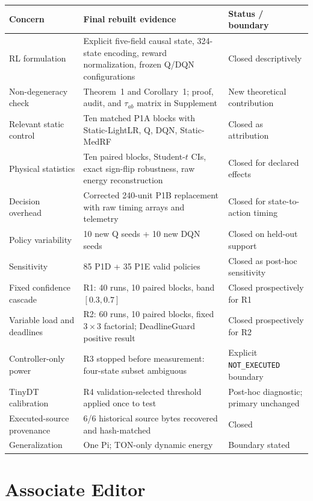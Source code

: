 \documentclass[11pt]{article}
\begin{document}
\begin{center}
\small
\begin{tabular}{p{3.6cm}p{6.8cm}p{4.2cm}}\toprule
\textbf{Concern} & \textbf{Final rebuilt evidence} & \textbf{Status / boundary}\\\midrule
RL formulation & Explicit five-field causal state, 324-state encoding, reward normalization, frozen Q/DQN configurations & Closed descriptively\\
Non-degeneracy check & Theorem~1 and Corollary~1; proof, audit, and $\tau_{ab}$ matrix in Supplement & New theoretical contribution\\
Relevant static control & Ten matched P1A blocks with Static-LightLR, Q, DQN, Static-MedRF & Closed as attribution\\
Physical statistics & Ten paired blocks, Student-$t$ CIs, exact sign-flip robustness, raw energy reconstruction & Closed for declared effects\\
Decision overhead & Corrected 240-unit P1B replacement with raw timing arrays and telemetry & Closed for state-to-action timing\\
Policy variability & 10 new Q seeds + 10 new DQN seeds & Closed on held-out support\\
Sensitivity & 85 P1D + 35 P1E valid policies & Closed as post-hoc sensitivity\\
Fixed confidence cascade & R1: 40 runs, 10 paired blocks, band $[0.3, 0.7]$ & Closed prospectively for R1\\
Variable load and deadlines & R2: 60 runs, 10 paired blocks, fixed $3\times3$ factorial; DeadlineGuard positive result & Closed prospectively for R2\\
Controller-only power & R3 stopped before measurement: four-state subset ambiguous & Explicit \texttt{NOT\_EXECUTED} boundary\\
TinyDT calibration & R4 validation-selected threshold applied once to test & Post-hoc diagnostic; primary unchanged\\
Executed-source provenance & 6/6 historical source bytes recovered and hash-matched & Closed\\
Generalization & One Pi; TON-only dynamic energy & Boundary stated\\
\bottomrule
\end{tabular}
\end{center}

\section*{Associate Editor}
\end{document}
